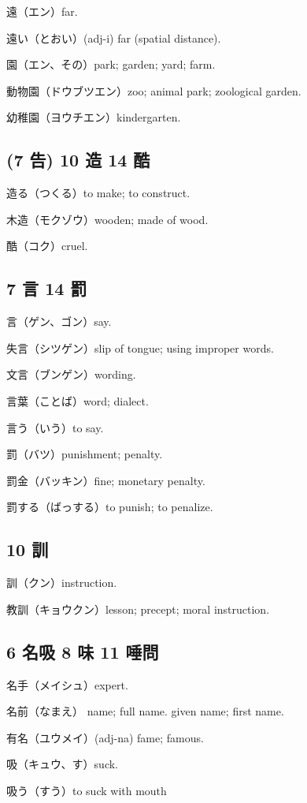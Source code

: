遠（エン）far.

遠い（とおい）(adj-i) far (spatial distance).

園（エン、その）park; garden; yard; farm.

動物園（ドウブツエン）zoo; animal park; zoological garden.

幼稚園（ヨウチエン）kindergarten.

\subsection{(7 告) 10 造 14 酷}

造る（つくる）to make; to construct.

木造（モクゾウ）wooden; made of wood.

酷（コク）cruel.

\subsection{7 言 14 罰}

言（ゲン、ゴン）say.

失言（シツゲン）slip of tongue; using improper words.

文言（ブンゲン）wording.

言葉（ことば）word; dialect.

言う（いう）to say.

罰（バツ）punishment; penalty.

罰金（バッキン）fine; monetary penalty.

罰する（ばっする）to punish; to penalize.

\subsection{10 訓}

訓（クン）instruction.

教訓（キョウクン）lesson; precept; moral instruction.

\subsection{6 名吸 8 味 11 唾問}

名手（メイシュ）expert.

名前（なまえ）
name; full name.
given name; first name.

有名（ユウメイ）(adj-na) fame; famous.

吸（キュウ、す）suck.

吸う（すう）to suck with mouth


